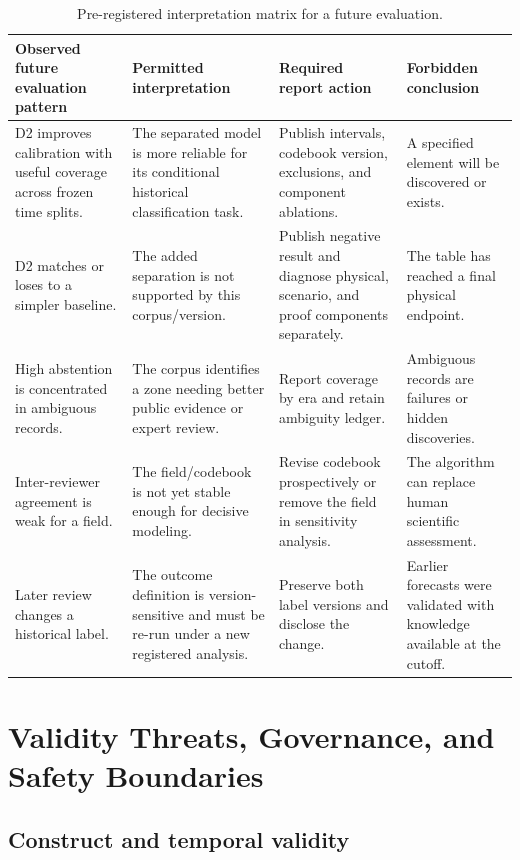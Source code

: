 \documentclass[conference]{IEEEtran}
\begin{document}
\begin{table}[!t]
\caption{Pre-registered interpretation matrix for a future evaluation.}
\label{tab:interpretation-matrix}
\centering
\renewcommand{\arraystretch}{1.18}
\begin{tabular}{|P{0.22\textwidth}|P{0.26\textwidth}|P{0.28\textwidth}|P{0.14\textwidth}|}
\hline
\textbf{Observed future evaluation pattern} & \textbf{Permitted interpretation} & \textbf{Required report action} & \textbf{Forbidden conclusion} \\
\hline
D2 improves calibration with useful coverage across frozen time splits. & The separated model is more reliable for its conditional historical classification task. & Publish intervals, codebook version, exclusions, and component ablations. & A specified element will be discovered or exists. \\
\hline
D2 matches or loses to a simpler baseline. & The added separation is not supported by this corpus/version. & Publish negative result and diagnose physical, scenario, and proof components separately. & The table has reached a final physical endpoint. \\
\hline
High abstention is concentrated in ambiguous records. & The corpus identifies a zone needing better public evidence or expert review. & Report coverage by era and retain ambiguity ledger. & Ambiguous records are failures or hidden discoveries. \\
\hline
Inter-reviewer agreement is weak for a field. & The field/codebook is not yet stable enough for decisive modeling. & Revise codebook prospectively or remove the field in sensitivity analysis. & The algorithm can replace human scientific assessment. \\
\hline
Later review changes a historical label. & The outcome definition is version-sensitive and must be re-run under a new registered analysis. & Preserve both label versions and disclose the change. & Earlier forecasts were validated with knowledge available at the cutoff. \\
\hline
\end{tabular}
\end{table}

\section{Validity Threats, Governance, and Safety Boundaries}

\subsection{Construct and temporal validity}
\end{document}
